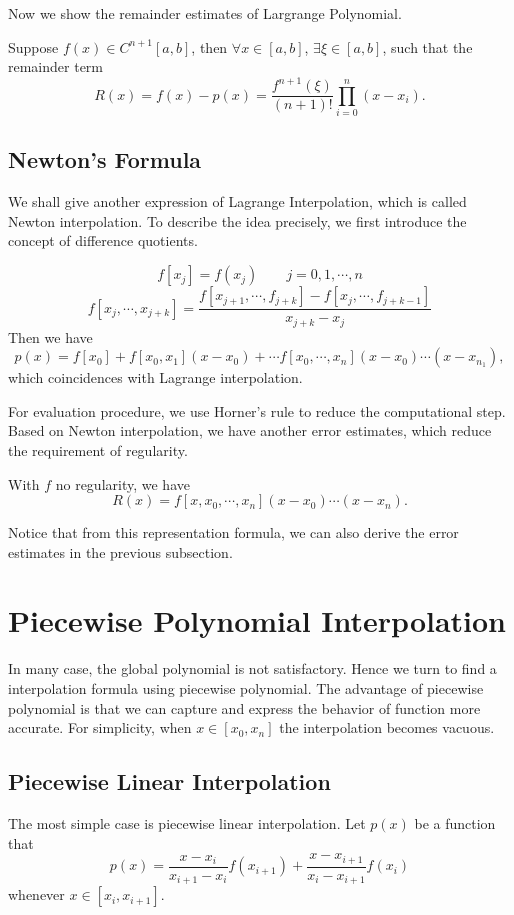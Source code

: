 \documentclass{article}
\begin{document}
Now we show the remainder estimates of Largrange Polynomial.

\begin{proposition}
	Suppose $f(x) \in C^{n+1}[a,b]$, then $\forall x \in [a,b]$, $\exists \xi \in [a,b]$, such that the remainder term $$R(x) = f(x) - p(x) = \frac{f^{n+1}(\xi)}{(n+1)!}\prod_{i = 0}^n(x-x_i).$$
\end{proposition}
\subsection{Newton's Formula}
We shall give another expression of Lagrange Interpolation, which is called Newton interpolation. To describe the idea precisely, we first introduce the concept of difference quotients.

$$f[x_j] = f(x_j) \qquad j = 0,1,\cdots,n$$
$$f[x_j,\cdots, x_{j+k}] = \frac{f[x_{j+1},\cdots, f_{j+k}] - f[x_{j},\cdots, f_{j+k-1}]}{x_{j+k} - x_j}$$
Then we have 
$$p(x) = f[x_0] + f[x_0,x_1](x-x_0) + \cdots f[x_0, \cdots, x_n](x-x_0)\cdots (x-x_{n_1}),$$
which coincidences with Lagrange interpolation. 


For evaluation procedure, we use Horner's rule to reduce the computational step.
Based on Newton interpolation, we have another error estimates, which reduce the requirement of regularity. 
\begin{proposition}
	With $f$ no regularity, we have 
	$$R(x) = f[x,x_0, \cdots, x_n] (x-x_0) \cdots (x-x_n).$$ 
\end{proposition}
Notice that from this representation formula, we can also derive the error estimates in the previous subsection. 
\section{Piecewise Polynomial Interpolation}
In many case, the global polynomial is not satisfactory. Hence we turn to find a interpolation formula using piecewise polynomial. The advantage of piecewise polynomial is that we can capture and express the behavior of function more accurate. For simplicity, when $x \in [x_0, x_{n}]$ the interpolation becomes vacuous. 
\subsection{Piecewise Linear Interpolation}
The most simple case is piecewise linear interpolation. Let $p(x)$ be a function that 
$$p(x) = \frac{x-x_i}{x_{i+1}-x_i}f(x_{i+1}) + \frac{x-x_{i+1}}{x_{i}-x_{i+1}}f(x_i)$$
whenever $x \in [x_i, x_{i+1}]$.
\end{document}
